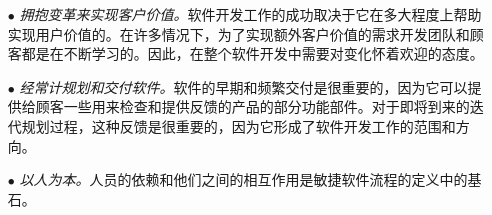 \documentclass[twocolumn]{svjour3}[]
\begin{document}
\begin{itemize}
    \item[$\bullet$] \textit{拥抱变革来实现客户价值\cite{beck2000extreme}。}软件开发工作的成功取决于它在多大程度上帮助实现用户价值的。在许多情况下，为了实现额外客户价值的需求开发团队和顾客都是在不断学习的。因此，在整个软件开发中需要对变化怀着欢迎的态度。
    \item[$\bullet$] \textit{经常计规划和交付软件\cite{beck2001manifesto,Cohn:2005:AEP:1036751,rosenberg2005agile}。}软件的早期和频繁交付是很重要的，因为它可以提供给顾客一些用来检查和提供反馈的产品的部分功能部件。对于即将到来的迭代规划过程，这种反馈是很重要的，因为它形成了软件开发工作的范围和方向。
    \item[$\bullet$] \textit{以人为本\cite{cockburn2001agile}。}人员的依赖和他们之间的相互作用是敏捷软件流程的定义中的基石。
\end{itemize}



\end{document}
